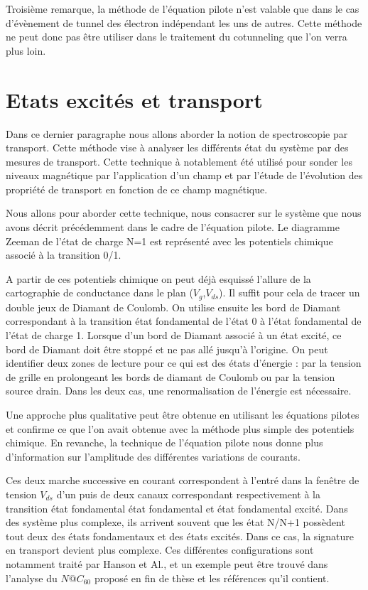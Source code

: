 Troisième remarque, la méthode de l'équation pilote n'est valable que dans le cas d'évènement de tunnel des électron indépendant les uns de autres. Cette méthode ne peut donc pas \^etre utiliser dans le traitement du cotunneling que l'on verra plus loin.

\section{Etats excités et transport}
Dans ce dernier paragraphe nous allons aborder la notion de spectroscopie par transport. Cette méthode vise à analyser les différents état du système par des mesures de transport. Cette technique à notablement été utilisé pour sonder les niveaux magnétique par l'application d'un champ et par l'étude de l'évolution des propriété de transport en fonction de ce champ magnétique.

Nous allons pour aborder cette technique, nous consacrer sur le système que nous avons décrit précédemment dans le cadre de l'équation pilote. Le diagramme Zeeman de l'état de charge N=1 est représenté avec les potentiels chimique associé à la transition 0/1.

A partir de ces potentiels chimique on peut déjà esquissé l'allure de la cartographie de conductance dans le plan ($V_g$,$V_{ds}$). Il suffit pour cela de tracer un double jeux de Diamant de Coulomb. On utilise ensuite les bord de Diamant correspondant à la transition état fondamental de l'état 0 à l'état fondamental de l'état de charge 1. Lorsque d'un bord de Diamant associé à un état excité, ce bord de Diamant doit \^etre stoppé et ne pas allé jusqu'à l'origine. On peut identifier deux zones de lecture pour ce qui est des états d'énergie : par la tension de grille en prolongeant les bords de diamant de Coulomb ou par la tension source drain. Dans les deux cas, une renormalisation de l'énergie est nécessaire.

Une approche plus qualitative peut \^etre obtenue en utilisant les équations pilotes et confirme ce que l'on avait obtenue avec la méthode plus simple des potentiels chimique. En revanche, la technique de l'équation pilote nous donne plus d'information sur l'amplitude des différentes variations de courants.

Ces deux marche successive en courant correspondent à l'entré dans la fen\^etre de tension $V_{ds}$ d'un puis de deux canaux correspondant respectivement à la transition état fondamental état fondamental et état fondamental excité. Dans des système plus complexe, ils arrivent souvent que les état N/N+1 possèdent tout deux des états fondamentaux et des états excités. Dans ce cas, la signature en transport devient plus complexe. Ces différentes configurations sont notamment traité par Hanson et Al., et un exemple peut \^etre trouvé dans l'analyse du $N@C_{60}$ proposé en fin de thèse et les références qu'il contient.

